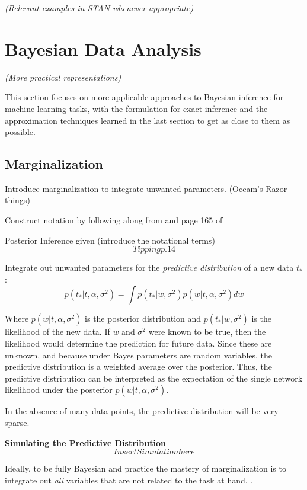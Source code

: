 \textit{(Relevant examples in STAN whenever appropriate)}


\section{Bayesian Data Analysis} %

\textit{(More practical representations)}

This section focuses on more applicable approaches to Bayesian inference for machine learning tasks, with the formulation for exact inference and the approximation techniques learned in the last section to get as close to them as possible.

\subsection{Marginalization}

Introduce marginalization to integrate unwanted parameters. (Occam's Razor things)

Construct notation by following along from 
\cite{tipping2004bayesian} and page 165 of \cite{bishop2006pattern}

Posterior Inference given (introduce the notational terms)
$$
Tipping p. 14
$$

Integrate out unwanted parameters for the \textit{predictive distribution} of a new data $t_*$:
$$
p(t_*|t,\alpha,\sigma^2) = \int p(t_*|w,\sigma^2) p(w|t,\alpha,\sigma^2) dw
$$

Where  $p(w|t,\alpha,\sigma^2)$ is the posterior distribution and $p(t_*|w,\sigma^2)$ is the likelihood of the new data.  If $w$ and $\sigma^2$ were known to be true, then the likelihood would determine the prediction for future data.  Since these are unknown, and because under Bayes parameters are random variables, the predictive distribution is a weighted average over the posterior.  Thus, the  predictive distribution can be interpreted as the expectation of the single network likelihood under the posterior $p(w|t,\alpha,\sigma^2)$. \cite{salad}


In the absence of many data points, the predictive distribution will be very sparse. \cite{tipping2004bayesian}


\textbf{Simulating the Predictive Distribution}
$$
Insert Simulationhere
$$

Ideally, to be fully Bayesian and practice the mastery of marginalization is to integrate out \textit{all} variables that are not related to the task at hand. \cite{bishop2006pattern}.

